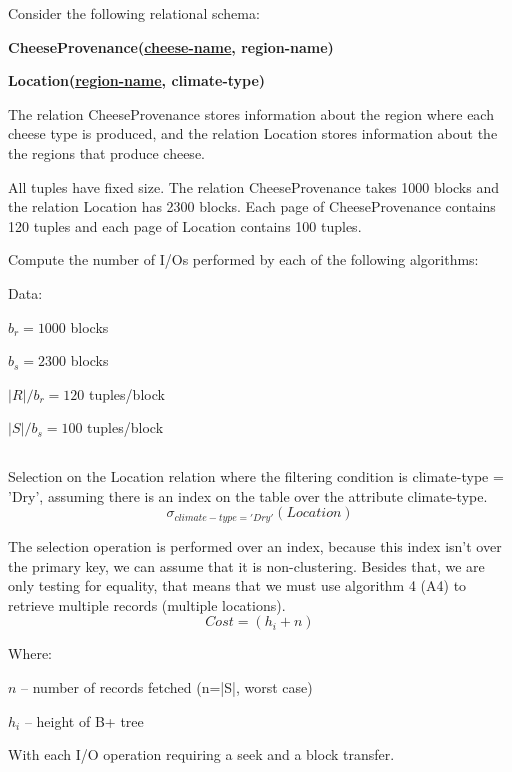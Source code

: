 {\color{gray}Consider the following relational schema:}
	
	\textbf{\color{gray}\tab CheeseProvenance(\underline{cheese-name}, region-name)}

	\textbf{\color{gray}\tab Location(\underline{region-name}, climate-type)}

{\color{gray}The relation CheeseProvenance stores information about the region where each cheese type is produced, and the relation Location stores information about the the regions that produce cheese.}

{\color{gray}All tuples have fixed size. The relation CheeseProvenance takes 1000 blocks and the relation Location has 2300 blocks. Each page of CheeseProvenance contains 120 tuples and each page of Location contains 100 tuples.}

{\color{gray} Compute the number of I/Os performed by each of the following algorithms:}

	Data:

	\tab $b_r = 1000$ blocks

	\tab $b_s = 2300$ blocks

	\tab $|R|/b_r = 120$ tuples/block

	\tab $|S|/b_s = 100$ tuples/block


	\subsection{}
	{\color{gray} Selection on the Location relation where the filtering condition is climate-type = 'Dry', assuming there is an index on the table over the attribute climate-type.}
	\begin{equation}\sigma_{climate-type='Dry'}(Location)\end{equation}

	The selection operation is performed over an index, because this index isn't over the primary key, we can assume that it is non-clustering. Besides that, we are only testing for equality, that means that we must use algorithm 4 (A4) to retrieve multiple records (multiple locations).
	\begin{equation}Cost = (h_i + n) \end{equation}
		
	Where:

	\tab $n$ – number of records fetched (n=|S|, worst case)

	\tab $h_i$ – height of B+ tree

	With each I/O operation requiring a seek and a block transfer.


